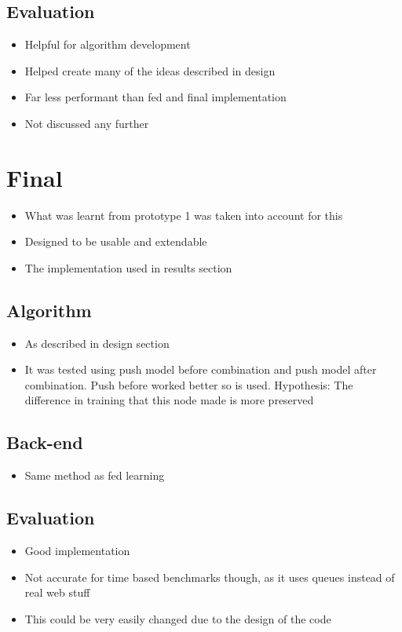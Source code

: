 \subsection{Evaluation}
\begin{itemize}
	\item Helpful for algorithm development
	\item Helped create many of the ideas described in design
	\item Far less performant than fed and final implementation
	\item Not discussed any further
\end{itemize}

\section{Final}
\begin{itemize}
	\item What was learnt from prototype 1 was taken into account for this
	\item Designed to be usable and extendable
	\item The implementation used in results section
\end{itemize}
\subsection{Algorithm}
\begin{itemize}
	\item As described in design section
	\item It was tested using push model before combination and push model after combination. Push before worked better so is used. Hypothesis: The difference in training that this node made is more preserved
\end{itemize}
\subsection{Back-end}
\begin{itemize}
	\item Same method as fed learning
\end{itemize}
\subsection{Evaluation}
\begin{itemize}
	\item Good implementation
	\item Not accurate for time based benchmarks though, as it uses queues instead of real web stuff
	\item This could be very easily changed due to the design of the code
\end{itemize}
